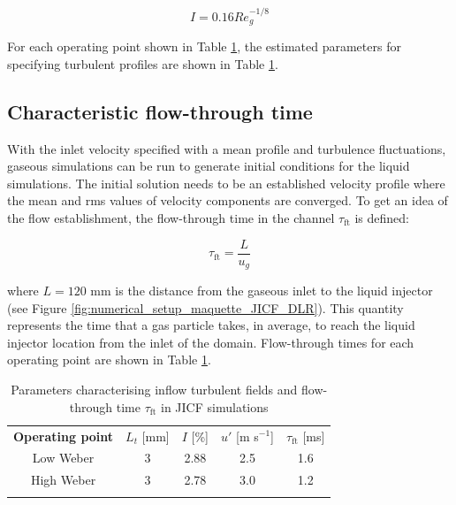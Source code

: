 \begin{equation}
I = 0.16 Re_g^{-1/8}
\end{equation}

For each operating point shown in Table \ref{tab:jicf_operating_conditions_turbulent_injection_parameters}, the estimated parameters for specifying turbulent profiles are shown in Table \ref{tab:jicf_operating_conditions_turbulent_injection_parameters}.


\subsection*{Characteristic flow-through time}

With the inlet velocity specified with a mean profile and turbulence fluctuations, gaseous simulations can be run to generate initial conditions for the liquid simulations. The initial solution needs to be an established velocity profile where the mean and rms values of velocity components are converged. To get an idea of the flow establishment, the flow-through time in the channel $\tau_\mathrm{ft}$ is defined:

\begin{equation}
\tau_\mathrm{ft} = \frac{L}{u_g}
\end{equation}

where $L = 120$ mm is the distance from the gaseous inlet to the liquid injector (see Figure \ref{fig:numerical_setup_maquette_JICF_DLR}). This quantity represents the time that a gas particle takes, in average, to reach the liquid injector location from the inlet of the domain. Flow-through times for each operating point are shown in Table \ref{tab:jicf_operating_conditions_turbulent_injection_parameters}.

\begin{table}[!h]
\centering
\caption{Parameters characterising inflow turbulent fields and flow-through time $\tau_\mathrm{ft}$ in JICF simulations}
\begin{tabular}{ccccc}
\thickhline
\textbf{Operating point} &  $L_t$ [mm] &  $I$ [\%] & $u'$ [m s$^{-1}$] & $\tau_\mathrm{ft}$ [ms] \\ %
\thickhline
Low Weber & 3 & 2.88 & 2.5 & 1.6 \\
High Weber & 3 & 2.78 & 3.0 & 1.2  \\
\thickhline
\end{tabular}
\label{tab:jicf_operating_conditions_turbulent_injection_parameters}
\end{table}

